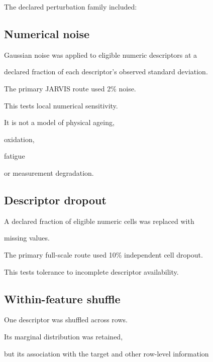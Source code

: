 \documentclass[11pt,a4paper,oneside]{report}
\begin{document}
The declared perturbation family included:



\subsection{Numerical noise}



Gaussian noise was applied to eligible numeric descriptors at a

declared fraction of each descriptor's observed standard deviation.



The primary JARVIS route used 2\% noise.



This tests local numerical sensitivity.



It is not a model of physical ageing,

oxidation,

fatigue

or measurement degradation.





\subsection{Descriptor dropout}



A declared fraction of eligible numeric cells was replaced with

missing values.



The primary full-scale route used 10\% independent cell dropout.



This tests tolerance to incomplete descriptor availability.





\subsection{Within-feature shuffle}



One descriptor was shuffled across rows.



Its marginal distribution was retained,

but its association with the target and other row-level information
\end{document}
